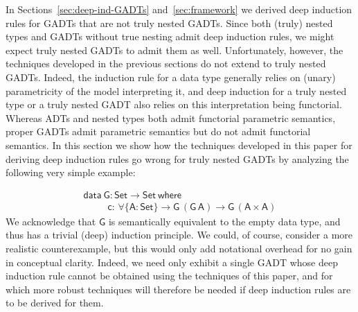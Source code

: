 \documentclass[9pt]{entcs}
\begin{document}
In Sections~\ref{sec:deep-ind-GADTs} and~\ref{sec:framework} we
derived deep induction rules for GADTs that are not truly nested
GADTs. Since both (truly) nested types and GADTs without true nesting
admit deep induction rules, we might expect truly nested GADTs to
admit them as well. Unfortunately, however, the techniques developed
in the previous sections do not extend to truly nested GADTs. Indeed,
the induction rule for a data type generally relies on (unary)
parametricity of the model interpreting it, and deep induction for a
truly nested type or a truly nested GADT also relies on this
interpretation being functorial.  Whereas ADTs and nested types both
admit functorial parametric semantics, proper GADTs admit parametric
semantics but do not admit functorial semantics. In this section we
show how the techniques developed in this paper for deriving deep
induction rules go wrong for truly nested GADTs by analyzing the
following very simple example:

\vspace*{-0.1in}

\begin{equation*}\label{gadt-nested}
\begin{array}{l}
\mathsf{data\ G : Set \to Set\ where}\\
\mathsf{\;\;\;\;\;\;\;\;\;c :\,  \forall \{A : Set\} \to G\,(G\,A) \to G\,(A \times A)}
\end{array}
\end{equation*}
We acknowledge that $\mathsf{G}$ is semantically equivalent to the
empty data type, and thus has a trivial (deep) induction principle. We
could, of course, consider a more realistic counterexample, but this
would only add notational overhead for no gain in conceptual
clarity. Indeed, we need only exhibit a single GADT whose deep
induction rule cannot be obtained using the techniques of this paper,
and for which more robust techniques will therefore be needed if deep
induction rules are to be derived for them.
\end{document}
